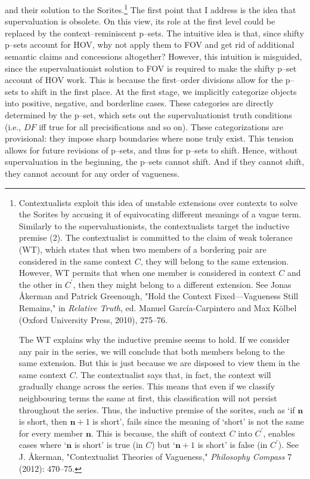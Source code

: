 and their solution to the Sorites.\footnote{Contextualists exploit this
  idea of unstable extensions over contexts to solve the Sorites by
  accusing it of equivocating different meanings of a vague term.
  Similarly to the supervaluationists, the contextualists target the
  inductive premise (2). The contextualist is committed to the claim of
  weak tolerance (WT), which states that when two members of a bordering
  pair are considered in the same context $C$, they will belong to the
  same extension. However, WT permits that when one member is considered
  in context $C$ and the other in $C^\prime$, then they might belong to a
  different extension. See Jonas Åkerman and Patrick Greenough, "Hold
  the Context Fixed---Vagueness Still Remains," in \textit{Relative
  Truth}, ed. Manuel García-Carpintero and Max Kölbel (Oxford University
  Press, 2010), 275--76.

  The WT explains why the inductive premise seems to hold. If we
  consider any pair in the series, we will conclude that both members
  belong to the same extension. But this is just because we are disposed
  to view them in the same context $C$. The contextualist says that, in
  fact, the context will gradually change across the series. This means
  that even if we classify neighbouring terms the same at first, this
  classification will not persist throughout the series. Thus, the
  inductive premise of the sorites, such as `if $\mathbf{n}$ is short, then $\mathbf{n}+1$ is short', fails since the meaning of `short' is not the same for every
  member $\mathbf{n}$. This is because, the shift of context $C$ into $C^\prime$,
  enables cases where `$\mathbf{n}$ is short' is true (in $C$) but `$\mathbf{n}+1$ is short' is false (in $C^\prime$). See J. Åkerman, "Contextualist Theories of Vagueness,"
  \textit{Philosophy Compass} 7 (2012): 470--75.}
The first point that I address is the idea that supervaluation is
obsolete. On this view, its role at the first level could be replaced by
the context--reminiscent p--sets. The intuitive idea is that, since shifty
p--sets account for HOV, why not apply them to FOV and get rid of
additional semantic claims and concessions altogether? However, this
intuition is misguided, since the supervaluationist solution to FOV is
required to make the shifty p--set account of HOV work. This is because
the first--order divisions allow for the p--sets to shift in the first
place. At the first stage, we implicitly categorize objects into
positive, negative, and borderline cases. These categories are directly
determined by the p--set, which sets out the supervaluationist truth
conditions (i.e., $DF$ iff true for all precisifications and so on). These
categorizations are provisional: they impose sharp boundaries where none
truly exist. This tension allows for future revisions of p--sets, and
thus for p--sets to shift. Hence, without supervaluation in the
beginning, the p--sets cannot shift. And if they cannot shift, they
cannot account for any order of vagueness.

